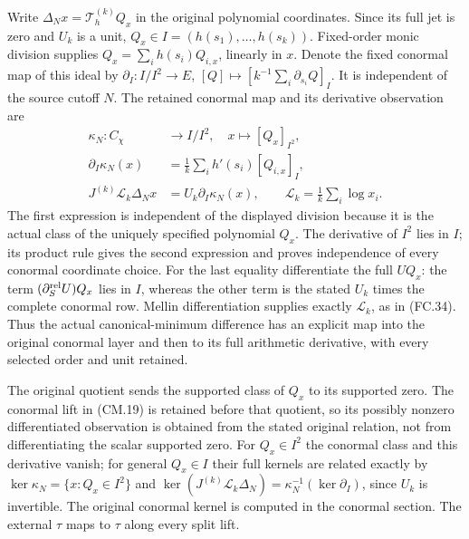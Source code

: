 Write \(\Delta_Nx=\mathcal T_h^{(k)}Q_x\) in the original
polynomial coordinates. Since its full jet is zero and \(U_k\) is a
unit, \(Q_x\in I=(h(s_1),\ldots,h(s_k))\). Fixed-order monic
division supplies \(Q_x=\sum_i h(s_i)Q_{i,x}\), linearly in \(x\).
Denote the fixed conormal map of this ideal by
\(\partial_I:I/I^2\to E\),
\([Q]\mapsto[k^{-1}\sum_i\partial_{s_i}Q]_I\).
It is independent of the source cutoff \(N\).
The retained conormal map and its derivative observation are
\[
 \begin{aligned}
 \kappa_N:C_\chi&\longrightarrow I/I^2,\quad
                    x\longmapsto[Q_x]_{I^2},\\
 \partial_I\kappa_N(x)&=\frac1k\sum_i h'(s_i)[Q_{i,x}]_I,\\
 J^{(k)}\mathscr L_k\Delta_Nx
       &=U_k\partial_I\kappa_N(x),\qquad
       \mathscr L_k=\frac1k\sum_i\log x_i.
 \end{aligned}
 \tag{CM.19}
\]
The first expression is independent of the displayed division because
it is the actual class of the uniquely specified polynomial \(Q_x\).
The derivative of \(I^2\) lies in \(I\); its product rule gives the
second expression and proves independence of every conormal coordinate
choice. For the last equality differentiate the full \(UQ_x\): the
term \((\partial_S^{\rm rel}U)Q_x\) lies in \(I\), whereas the
other term is the stated \(U_k\) times the complete conormal row.
Mellin differentiation supplies exactly \(\mathscr L_k\), as in
(FC.34). Thus the actual canonical-minimum difference has an explicit
map into the original conormal layer and then to its full arithmetic
derivative, with every selected order and unit retained.

The original quotient sends the supported class of \(Q_x\) to its
supported zero. The conormal lift in (CM.19) is retained before that
quotient, so its possibly nonzero differentiated observation is obtained
from the stated original relation, not from differentiating the scalar
supported zero. For \(Q_x\in I^2\) the conormal class and this
derivative vanish; for general \(Q_x\in I\) their full kernels are
related exactly by
\(\ker\kappa_N=\{x:Q_x\in I^2\}\) and
\(\ker(J^{(k)}\mathscr L_k\Delta_N)
=\kappa_N^{-1}(\ker\partial_I)\), since \(U_k\) is invertible.
The original conormal kernel is computed in the conormal section. The
external \(\tau\) maps to \(\tau\) along every split lift.
